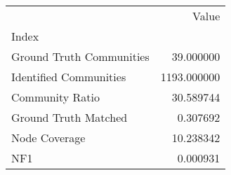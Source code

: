 \begin{tabular}{lr}
\toprule
{} &        Value \\
Index                    &              \\
\midrule
Ground Truth Communities &    39.000000 \\
Identified Communities   &  1193.000000 \\
Community Ratio          &    30.589744 \\
Ground Truth Matched     &     0.307692 \\
Node Coverage            &    10.238342 \\
NF1                      &     0.000931 \\
\bottomrule
\end{tabular}
